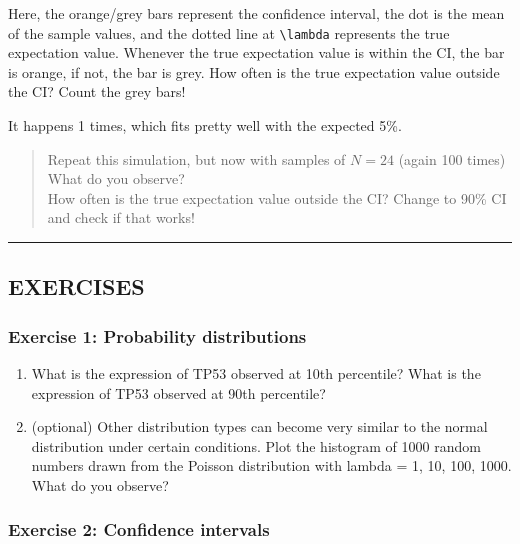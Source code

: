 \documentclass[
]{book}
\begin{document}
Here, the orange/grey bars represent the confidence interval, the dot is the mean of the sample values, and the dotted line at \texttt{\textbackslash{}lambda} represents the true expectation value. Whenever the true expectation value is within the CI, the bar is orange, if not, the bar is grey. How often is the true expectation value outside the CI? Count the grey bars!

It happens 1 times, which fits pretty well with the expected 5\%.

\begin{quote}
Repeat this simulation, but now with samples of \(N=24\) (again 100 times)\\
What do you observe?\\
How often is the true expectation value outside the CI? Change to 90\% CI and check if that works!
\end{quote}

\begin{center}\rule{0.5\linewidth}{0.5pt}\end{center}

\hypertarget{exercises-2}{%
\subsection{EXERCISES}\label{exercises-2}}

\hypertarget{exercise-1-probability-distributions}{%
\subsubsection{Exercise 1: Probability distributions}\label{exercise-1-probability-distributions}}

\begin{enumerate}
\def\labelenumi{\arabic{enumi}.}
\item
  What is the expression of TP53 observed at 10th percentile? What is the expression of TP53 observed at 90th percentile?
\item
  (optional) Other distribution types can become very similar to the normal distribution under certain conditions. Plot the histogram of 1000 random numbers drawn from the Poisson distribution with lambda = 1, 10, 100, 1000. What do you observe?
\end{enumerate}

\hypertarget{exercise-2-confidence-intervals}{%
\subsubsection{Exercise 2: Confidence intervals}\label{exercise-2-confidence-intervals}}
\end{document}
